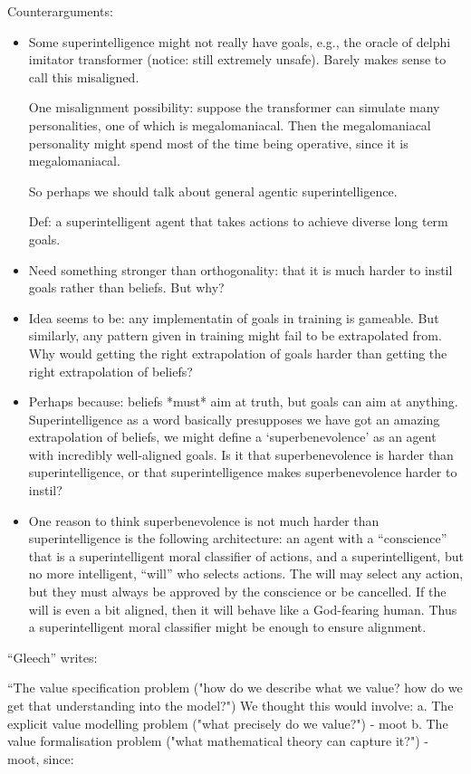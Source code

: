 \documentclass[11pt]{article}
\begin{document}
Counterarguments:
\begin{itemize}
    \item Some superintelligence might not really have goals, e.g., the oracle of delphi imitator transformer (notice: still extremely unsafe). Barely makes sense to call this misaligned.
    
    One misalignment possibility: suppose the transformer can simulate many personalities, one of which is megalomaniacal. Then the megalomaniacal personality might spend most of the time being operative, since it is megalomaniacal.
    
    So perhaps we should talk about general agentic superintelligence.
    
    Def: a superintelligent agent that takes actions to achieve diverse long term goals.
    \item Need something stronger than orthogonality: that it is much harder to instil goals rather than beliefs. But why?
    \item Idea seems to be: any implementatin of goals in training is gameable. But similarly, any pattern given in training might fail to be extrapolated from. Why would getting the right extrapolation of goals harder than getting the right extrapolation of beliefs?
    \item Perhaps because: beliefs *must* aim at truth, but goals can aim at anything. Superintelligence as a word basically presupposes we have got an amazing extrapolation of beliefs, we might define a `superbenevolence' as an agent with incredibly well-aligned goals. Is it that superbenevolence is harder than superintelligence, or that superintelligence makes superbenevolence harder to instil?
    \item One reason to think superbenevolence is not much harder than superintelligence is the following architecture: an agent with a ``conscience'' that is a superintelligent moral classifier of actions, and a superintelligent, but no more intelligent, ``will'' who selects actions. The will may select any action, but they must always be approved by the conscience or be cancelled. If the will is even a bit aligned, then it will behave like a God-fearing human. Thus a superintelligent moral classifier might be enough to ensure alignment.
\end{itemize}

``Gleech'' writes:

``The value specification problem ("how do we describe what we value? how do we get that understanding into the model?")
We thought this would involve:
a. The explicit value modelling problem ("what precisely do we value?") - moot
b. The value formalisation problem ("what mathematical theory can capture it?") - moot, since:
\end{document}
